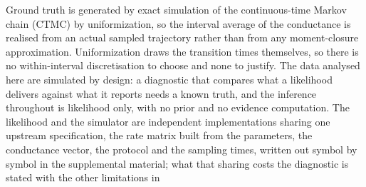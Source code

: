 Ground truth is generated by exact simulation of the continuous-time Markov chain
(CTMC) by uniformization, so the interval average of the conductance is realised
from an actual sampled trajectory rather than from any moment-closure
approximation. Uniformization draws the transition times themselves, so there is no
within-interval discretisation to choose and none to justify.
The data analysed here are simulated by design: a diagnostic that compares what a
likelihood delivers against what it reports needs a known truth, and the inference
throughout is likelihood only, with no prior and no evidence computation.
The likelihood and the simulator are independent implementations sharing one upstream
specification, the rate matrix built from the parameters, the conductance vector, the
protocol and the sampling times, written out symbol by symbol in the supplemental material; what that sharing costs the diagnostic is stated with the other limitations in

